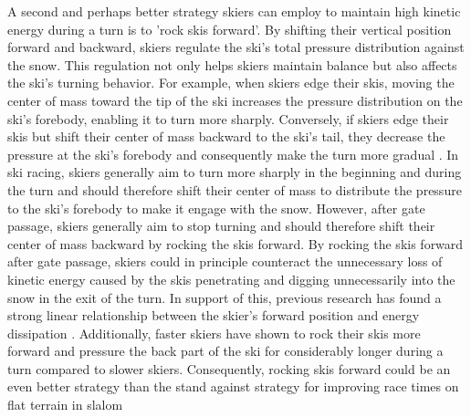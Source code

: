 A second and perhaps better strategy skiers can employ to maintain high kinetic energy during a turn is to 'rock skis forward'. By shifting their vertical position forward and backward, skiers regulate the ski’s total pressure distribution against the snow\cite{lemaster_skiers_1999, lemaster_ultimate_2010, howe_new_2001}. This regulation not only helps skiers maintain balance but also affects the ski's turning behavior. For example, when skiers edge their skis, moving the center of mass toward the tip of the ski increases the pressure distribution on the ski's forebody, enabling it to turn more sharply. Conversely, if skiers edge their skis but shift their center of mass backward to the ski's tail, they decrease the pressure at the ski's forebody and consequently make the turn more gradual \cite{lemaster_skiers_1999, lemaster_ultimate_2010}. In ski racing, skiers generally aim to turn more sharply in the beginning and during the turn and should therefore shift their center of mass to distribute the pressure to the ski's forebody to make it engage with the snow. However, after gate passage, skiers generally aim to stop turning and should therefore shift their center of mass backward by rocking the skis forward. By rocking the skis forward after gate passage, skiers could in principle counteract the unnecessary loss of kinetic energy caused by the skis penetrating and digging unnecessarily into the snow in the exit of the turn. In support of this, previous research has found a strong linear relationship between the skier's forward position and energy dissipation \cite{reid_turn_2009, reid_kinematic_2010}. Additionally, faster skiers have shown to rock their skis more forward and pressure the back part of the ski for considerably longer during a turn compared to slower skiers\cite{reid_kinematic_2010, tjorhom_beskrivelse_2007}. Consequently, rocking skis forward could be an even better strategy than the stand against strategy for improving race times on flat terrain in slalom 

